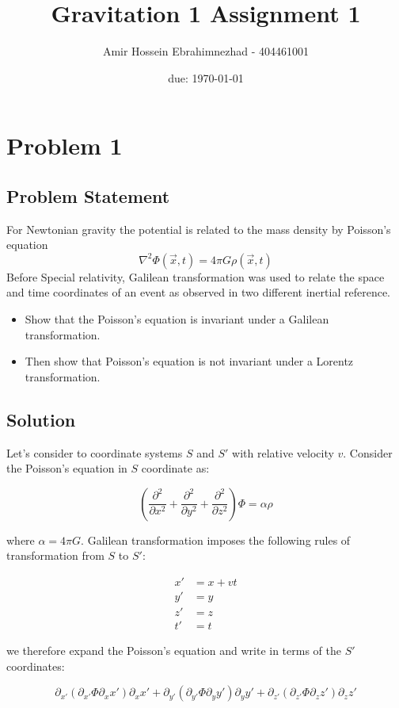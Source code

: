 \documentclass[10pt,twocoloumn]{article}
\title{Gravitation 1 Assignment 1}
\author{Amir Hossein Ebrahimnezhad - 404461001}
\date{due: \today}
\begin{document}
\maketitle
\section*{Problem 1}
\subsection*{Problem Statement}
For Newtonian gravity the potential is related to the mass density by Poisson's equation
\begin{equation}
\nabla^2\Phi(\vec{x},t) = 4\pi G \rho(\vec x , t)
\end{equation}
Before Special relativity, Galilean transformation was used to relate the space and time coordinates of an event as observed in two different inertial reference.

\begin{itemize}
    \item Show that the Poisson's equation is invariant under a Galilean transformation.
    \item Then show that Poisson's equation is not invariant under a Lorentz transformation.
\end{itemize}
\subsection*{Solution}
Let's consider to coordinate systems $S$ and $S'$ with relative velocity $v$. Consider the Poisson's equation in $S$ coordinate as:

\begin{equation}
\left(\frac{\partial^2}{\partial x^2} + \frac{\partial^2}{\partial y^2} + \frac{\partial^2}{\partial z^2}\right)\Phi  = \alpha \rho
\end{equation}

where $\alpha = 4\pi G$. Galilean transformation imposes the following rules of transformation from $S$ to $S'$:

\begin{align}
x'&= x +  vt\\
y'&=y\\
z'&=z \\
t'&=t
\end{align}

we therefore expand the Poisson's equation and write in terms of the $S'$ coordinates:

\begin{equation}
\partial_{x'}\left(\partial_{x'}\Phi \partial_xx' \right)\partial_xx' + \partial_{y'}\left(\partial_{y'}\Phi \partial_yy' \right)\partial_yy' +\partial_{z'}\left(\partial_{z'}\Phi \partial_zz' \right)\partial_zz'
\end{equation}
\end{document}
